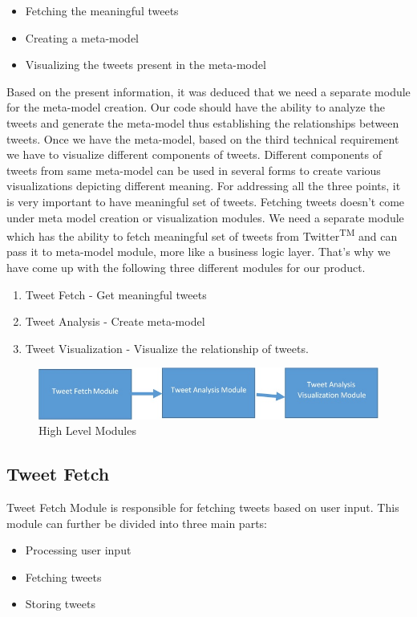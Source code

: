 \documentclass[11pt]{article}
\begin{document}
\begin{itemize}
\item Fetching the meaningful tweets
\item Creating a meta-model
\item Visualizing the tweets present in the meta-model
\end{itemize}


Based on the present information, it was deduced that we need a separate module for the meta-model creation. Our code should have the ability to analyze the tweets and generate the meta-model thus establishing the relationships between tweets. Once we have the meta-model, based on the third technical requirement we have to visualize different components of tweets. Different components of tweets from same meta-model can be used in several forms to create various visualizations depicting different meaning. For addressing all the three points, it is very important to have meaningful set of tweets. Fetching tweets doesn't come under meta model creation or visualization modules. We need a separate module which has the ability to fetch meaningful set of tweets from Twitter\textsuperscript{TM} and can pass it to meta-model module, more like a business logic layer. That's why we have come up with the following three different modules for our product.
\begin{enumerate}
\item Tweet Fetch - Get meaningful tweets
\item Tweet Analysis - Create meta-model
\item Tweet Visualization - Visualize the relationship of tweets.
\end{enumerate}

\begin{figure}[h]
\centering
\includegraphics[width=\textwidth]{HighLevelDesign.jpg}
\caption{High Level Modules}
\end{figure}

\subsection{Tweet Fetch}
Tweet Fetch Module is responsible for fetching tweets based on user input. This module can further be divided into three main parts: 
\begin{itemize}
\item Processing user input
\item Fetching tweets
\item Storing tweets
\end{itemize}
\end{document}
